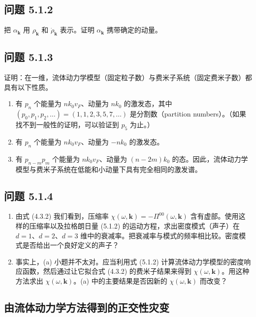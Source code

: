 \subsection*{问题 5.1.2}

把 $\alpha_{\pmb{k}}$ 用 $\rho_{\pmb{k}}$ 和 $\dot{\rho}_{\pmb{k}}$ 表示。证明 $\alpha_{\pmb{k}}$ 携带确定的动量。

\subsection*{问题 5.1.3}

证明：在一维，流体动力学模型（固定粒子数）与费米子系统（固定费米子数）都具有以下性质。
\begin{enumerate}
\item[(a)] 有 $p_n$ 个能量为 $nk_0v_F$、动量为 $nk_0$ 的激发态，其中 $(p_0,p_1,p_2,\ldots)=(1,1,2,3,5,7,\ldots)$ 是分割数（partition numbers）。（如果找不到一般性的证明，可以验证到 $p_5$ 为止。）
\item[(b)] 有 $p_n$ 个能量为 $nk_0v_F$、动量为 $-nk_0$ 的激发态。
\item[(c)] 有 $p_{n-m}p_m$ 个能量为 $nk_0v_F$、动量为 $(n-2m)k_0$ 的态。因此，流体动力学模型与费米子系统在低能和小动量下具有完全相同的激发谱。
\end{enumerate}

\subsection*{问题 5.1.4}

\begin{enumerate}
\item[(a)] 由式 (4.3.2) 我们看到，压缩率 $\chi(\omega,\pmb{k})=-\Pi^{00}(\omega,\pmb{k})$ 含有虚部。使用这样的压缩率以及拉格朗日量 (5.1.2) 的运动方程，求出密度模式（声子）在 $d=1$、$d=2$、$d=3$ 维中的衰减率。把衰减率与模式的频率相比较。密度模式是否给出一个良好定义的声子？
\item[(b)] 事实上，(a) 小题并不太对。应当利用式 (5.1.2) 计算流体动力学模型的密度响应函数，然后通过让它拟合式 (4.3.2) 的费米子结果来得到 $\chi(\omega,\pmb{k})$。用这种方法求出 $\chi(\omega,\pmb{k})$。(a) 中的主要结果是否因新的 $\chi(\omega,\pmb{k})$ 而改变？
\end{enumerate}

\subsection{由流体动力学方法得到的正交性灾变}

